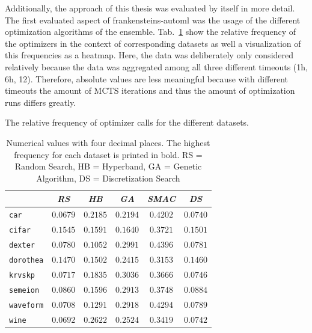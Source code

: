 Additionally, the approach of this thesis was evaluated by itself in more detail.
The first evaluated aspect of frankensteins-automl was the usage of the different optimization algorithms of the ensemble.\newline
Tab.~\ref{table:optimizer-calls} show the relative frequency of the optimizers in the context of corresponding datasets as well a visualization of this frequencies as a heatmap.
Here, the data was deliberately only considered relatively because the data was aggregated among all three different timeouts (1h, 6h, 12).
Therefore, absolute values are less meaningful because with different timeouts the amount of MCTS iterations and thus the amount of optimization runs differs greatly.

\begin{table}[ht]
    \caption{The relative frequency of optimizer calls for the different datasets.}
    \label{table:optimizer-calls}
    \begin{subtable}{\textwidth}
        \centering
        \caption{Numerical values with four decimal places. The highest frequency for each dataset is printed in bold. RS = Random Search, HB = Hyperband, GA = Genetic Algorithm, DS = Discretization Search}
        \renewcommand{\arraystretch}{1.5}
        \begin{tabular}{l|ccccc}
            & \textit{RS} & \textit{HB} & \textit{GA} & \textit{SMAC} & \textit{DS} \\
            \hline
            \texttt{car} & $0.0679$ & $0.2185$ & $0.2194$ & $\boldsymbol{0.4202}$ & $0.0740$ \\
            \texttt{cifar} & $0.1545$ & $0.1591$ & $0.1640$ & $\boldsymbol{0.3721}$ & $0.1501$ \\
            \texttt{dexter} & $0.0780$ & $0.1052$ & $0.2991$ & $\boldsymbol{0.4396}$ & $0.0781$ \\
            \texttt{dorothea} & $0.1470$ & $0.1502$ & $0.2415$ & $\boldsymbol{0.3153}$ & $0.1460$ \\
            \texttt{krvskp} & $0.0717$ & $0.1835$ & $0.3036$ & $\boldsymbol{0.3666}$ & $0.0746$ \\
            \texttt{semeion} & $0.0860$ & $0.1596$ & $0.2913$ & $\boldsymbol{0.3748}$ & $0.0884$ \\
            \texttt{waveform} & $0.0708$ & $0.1291$ & $0.2918$ & $\boldsymbol{0.4294}$ & $0.0789$ \\
            \texttt{wine} & $0.0692$ & $0.2622$ & $0.2524$ & $\boldsymbol{0.3419}$ & $0.0742$ \\

\end{tabular}
\end{subtable}
\end{table}
